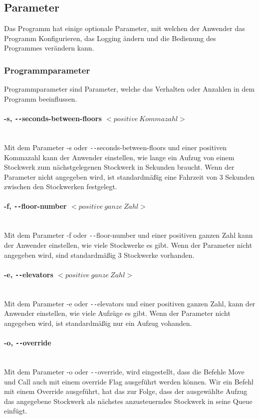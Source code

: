 \subsection{Parameter}
Das Programm hat einige optionale Parameter, mit welchen der Anwender das Programm Konfigurieren, das Logging ändern und die Bedienung des Programmes verändern kann.


\subsubsection{Programmparameter}
Programmparameter sind Parameter, welche das Verhalten oder Anzahlen in dem Programm beeinflussen.

\paragraph{-s, \texttt{-{}-}seconds-between-floors $<positive \: Kommazahl>$}\mbox{} \\
Mit dem Parameter -s oder \texttt{-{}-}seconds-between-floors und einer positiven Kommazahl kann der Anwender einstellen, wie lange ein Aufzug von einem Stockwerk zum nächstgelegenen Stockwerk in Sekunden braucht. Wenn der Parameter nicht angegeben wird, ist standardmäßig eine Fahrzeit von 3 Sekunden zwischen den Stockwerken festgelegt.

\paragraph{-f, \texttt{-{}-}floor-number $<positive \: ganze \: Zahl>$}\mbox{} \\
Mit dem Parameter -f oder \texttt{-{}-}floor-number und einer positiven ganzen Zahl kann der Anwender einstellen, wie viele Stockwerke es gibt. Wenn der Parameter nicht angegeben wird, sind standardmäßig 3 Stockwerke vorhanden.

\paragraph{-e, \texttt{-{}-}elevators $<positive \: ganze \: Zahl>$}\mbox{} \\
Mit dem Parameter -e oder \texttt{-{}-}elevators und einer positiven ganzen Zahl, kann der Anwender einstellen, wie viele Aufzüge es gibt. Wenn der Parameter nicht angegeben wird, ist standardmäßig nur ein Aufzug vohanden.

\paragraph{-o, \texttt{-{}-}override}\mbox{} \\
Mit dem Parameter -o oder \texttt{-{}-}override, wird eingestellt, dass die Befehle Move und Call auch mit einem override Flag ausgeführt werden können. Wir ein Befehl mit einem Override ausgeführt, hat das zur Folge, dass der ausgewählte Aufzug das angegebene Stockwerk als nächstes anzusteuerndes Stockwerk in seine Queue einfügt.

